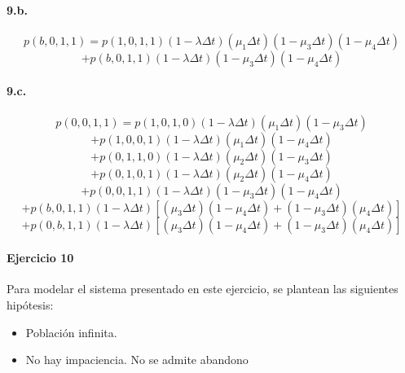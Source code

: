 \documentclass{article}
\begin{document}
   \paragraph{9.b.}
      $$p(b,0,1,1) = p(1,0,1,1) (1 - \lambda \Delta t) (\mu_1 \Delta t) (1 - \mu_3 \Delta t) (1 - \mu_4 \Delta t)$$
      $$           + p(b,0,1,1) (1 - \lambda \Delta t) (1 - \mu_3 \Delta t) (1 - \mu_4 \Delta t)$$

   \paragraph{9.c.}
      $$p(0,0,1,1) = p(1,0,1,0) (1 - \lambda \Delta t) (\mu_1 \Delta t) (1 - \mu_3 \Delta t)$$
      $$           + p(1,0,0,1) (1 - \lambda \Delta t) (\mu_1 \Delta t) (1 - \mu_4 \Delta t)$$
      $$           + p(0,1,1,0) (1 - \lambda \Delta t) (\mu_2 \Delta t) (1 - \mu_3 \Delta t)$$
      $$           + p(0,1,0,1) (1 - \lambda \Delta t) (\mu_2 \Delta t) (1 - \mu_4 \Delta t)$$
      $$           + p(0,0,1,1) (1 - \lambda \Delta t) (1 - \mu_3 \Delta t) (1 - \mu_4 \Delta t)$$
      $$           + p(b,0,1,1) (1 - \lambda \Delta t) [(\mu_3 \Delta t) (1 - \mu_4 \Delta t) + (1 - \mu_3 \Delta t) (\mu_4 \Delta t)]$$
      $$           + p(0,b,1,1) (1 - \lambda \Delta t) [(\mu_3 \Delta t) (1 - \mu_4 \Delta t) + (1 - \mu_3 \Delta t) (\mu_4 \Delta t)]$$


\paragraph{Ejercicio 10}
   Para modelar el sistema presentado en este ejercicio, se plantean las siguientes hip\'otesis:

   \begin{itemize}
      \item Poblaci\'on infinita.
      \item No hay impaciencia. No se admite abandono
   \end{itemize}
\end{document}

